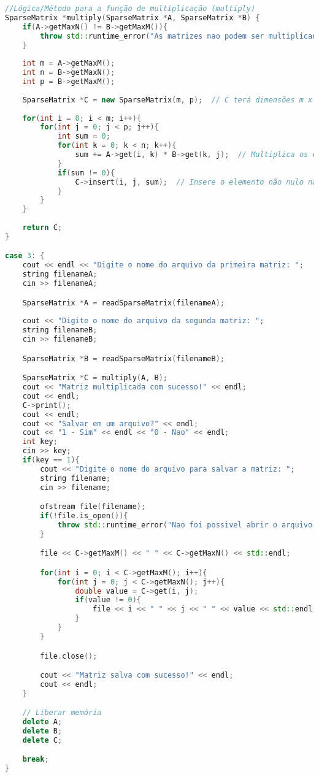 \documentclass[a4paper,12pt]{article}
\begin{document}
\begin{lstlisting}[language=C++]
//Lógica/Método para a função de multiplicação (multiply)
SparseMatrix *multiply(SparseMatrix *A, SparseMatrix *B) {
    if(A->getMaxN() != B->getMaxM()){
        throw std::runtime_error("As matrizes nao podem ser multiplicadas. O numero de colunas de A deve ser igual ao numero de linhas de B.");
    }
    
    int m = A->getMaxM();
    int n = B->getMaxN();
    int p = B->getMaxM();
    
    SparseMatrix *C = new SparseMatrix(m, p);  // C terá dimensões m x p
    
    for(int i = 0; i < m; i++){
        for(int j = 0; j < p; j++){
            int sum = 0;
            for(int k = 0; k < n; k++){
                sum += A->get(i, k) * B->get(k, j);  // Multiplica os elementos correspondentes e soma
            }
            if(sum != 0){
                C->insert(i, j, sum);  // Insere o elemento não nulo na matriz resultante C
            }
        }
    }
    
    return C;
}

case 3: {
    cout << endl << "Digite o nome do arquivo da primeira matriz: ";
    string filenameA;
    cin >> filenameA;

    SparseMatrix *A = readSparseMatrix(filenameA);
    
    cout << "Digite o nome do arquivo da segunda matriz: ";
    string filenameB;
    cin >> filenameB;

    SparseMatrix *B = readSparseMatrix(filenameB);

    SparseMatrix *C = multiply(A, B);
    cout << "Matriz multiplicada com sucesso!" << endl;
    cout << endl;
    C->print();
    cout << endl;
    cout << "Salvar em um arquivo?" << endl;
    cout << "1 - Sim" << endl << "0 - Nao" << endl;
    int key;
    cin >> key;
    if(key == 1){
        cout << "Digite o nome do arquivo para salvar a matriz: ";
        string filename;
        cin >> filename;

        ofstream file(filename);
        if(!file.is_open()){
            throw std::runtime_error("Nao foi possivel abrir o arquivo: " + filename);
        }

        file << C->getMaxM() << " " << C->getMaxN() << std::endl;

        for(int i = 0; i < C->getMaxM(); i++){
            for(int j = 0; j < C->getMaxN(); j++){
                double value = C->get(i, j);
                if(value != 0){
                    file << i << " " << j << " " << value << std::endl;
                }
            }
        }

        file.close();

        cout << "Matriz salva com sucesso!" << endl;
        cout << endl;
    }

    // Liberar memória
    delete A;
    delete B;
    delete C;

    break;
}
\end{lstlisting}
\end{document}
